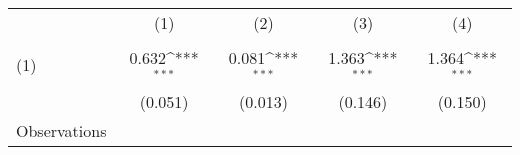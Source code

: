 {
\def\sym#1{\ifmmode^{#1}\else\(^{#1}\)\fi}
\begin{tabular}{l*{4}{c}}
\hline\hline
                    &\multicolumn{1}{c}{(1)}&\multicolumn{1}{c}{(2)}&\multicolumn{1}{c}{(3)}&\multicolumn{1}{c}{(4)}\\
                    &\multicolumn{1}{c}{} &\multicolumn{1}{c}{} &\multicolumn{1}{c}{} &\multicolumn{1}{c}{} \\
\hline
(1)                 &       0.632\sym{***}&       0.081\sym{***}&       1.363\sym{***}&       1.364\sym{***}\\
                    &     (0.051)         &     (0.013)         &     (0.146)         &     (0.150)         \\
\hline
Observations        &                     &                     &                     &                     \\
\hline\hline
\end{tabular}
}
